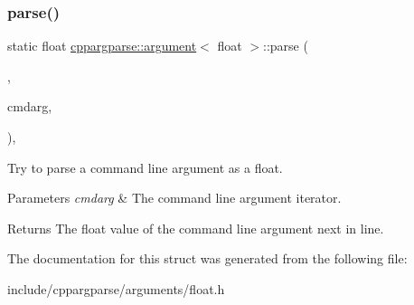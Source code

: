 \subsubsection{\texorpdfstring{parse()}{parse()}}
{\footnotesize\ttfamily static float \hyperlink{structcppargparse_1_1argument}{cppargparse\+::argument}$<$ float $>$\+::parse (\begin{DoxyParamCaption}\item[{const types\+::\+Command\+Line\+\_\+t \&}]{,  }\item[{const types\+::\+Command\+Line\+Argument\+\_\+t \&}]{cmdarg,  }\item[{const types\+::\+Command\+Line\+Arguments\+Map\+\_\+t \&}]{ }\end{DoxyParamCaption})\hspace{0.3cm}{\ttfamily [inline]}, {\ttfamily [static]}}



Try to parse a command line argument as a float. 


\begin{DoxyParams}{Parameters}
{\em cmdarg} & The command line argument iterator.\\
\hline
\end{DoxyParams}
\begin{DoxyReturn}{Returns}
The float value of the command line argument next in line. 
\end{DoxyReturn}


The documentation for this struct was generated from the following file\+:\begin{DoxyCompactItemize}
\item 
include/cppargparse/arguments/float.\+h\end{DoxyCompactItemize}
